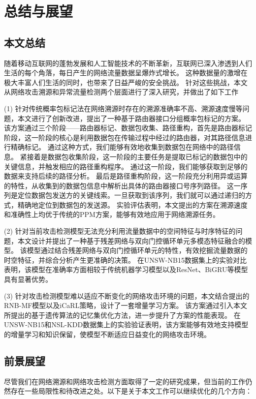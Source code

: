 \chapter{总结与展望}
\label{cha:over_view}

\section{本文总结}


随着移动互联网的蓬勃发展和人工智能技术的不断革新，互联网已深入渗透到人们生活的每个角落，每日产生的网络流量数据呈爆炸式增长。
这种数据量的激增在极大丰富人们生活的同时，也带来了日益严峻的安全挑战。
针对这些挑战，本文从网络攻击溯源和异常流量检测两个层面进行了深入研究，并做出了如下工作\par
(1) 针对传统概率包标记法在网络溯源时存在的溯源准确率不高、溯源速度慢等问题，本文进行了创新改进，提出了一种基于路由器接口分组概率包标记的方案。
该方案通过三个阶段——路由器标记、数据包收集、路径重构，首先是路由器标记阶段，这一阶段的核心是利用数据包在传输过程中经过的路由器，对其路径信息进行精确标记。
通过这种方式，我们能够有效地收集到数据包在网络中的路径信息。
紧接着是数据包收集阶段，这一阶段的主要任务是提取已标记的数据包中的关键信息，并触发相应的路径重构程序。
通过这一阶段，我们能够获取到足够的数据来支持后续的路径分析。
最后是路径重构阶段，这一阶段充分利用异或运算的特性，从收集到的数据包信息中解析出具体的路由器接口号序列路径。
这一序列是定位数据包发送方的关键线索。一旦获取到该序列，我们就可以通过递归的方式，精确地定位到数据包的发送源。
实验评估表明，本文提出的方案在溯源速度和准确性上均优于传统的PPM方案，能够有效地应用于网络溯源任务。\par
(2) 针对当前攻击检测模型无法充分利用流量数据中的空间特征与时序特征的问题，本文设计并提出了一种基于残差网络与双向门控循环单元多模态特征融合的模型。
该模型通过结合残差网络与双向门控循环单元的特性，有效挖掘流量数据的时空特征，并综合分析产生更准确的决策。
在UNSW-NB15数据集上的实验对比表明，该模型在准确率方面相较于传统机器学习模型以及ResNet、BiGRU等模型具有显著优势。\par
(3) 针对攻击检测模型难以适应不断变化的网络攻击环境的问题，本文结合提出的RNB-MF模型以及iCaRL策略，设计了一套增量学习方案。
该方案通过引入本文所提出的基于遗传算法的记忆集优化方法，进一步提升了方案的性能表现。
在UNSW-NB15和NSL-KDD数据集上的实验验证表明，该方案能够有效地支持模型的增量学习和知识保留，使模型不断适应日益变化的网络攻击环境。\par

\section{前景展望}
尽管我们在网络溯源和网络攻击检测方面取得了一定的研究成果，但当前的工作仍然存在一些局限性和待改进之处。以下是关于本文工作可以继续优化的几个方向：\par

